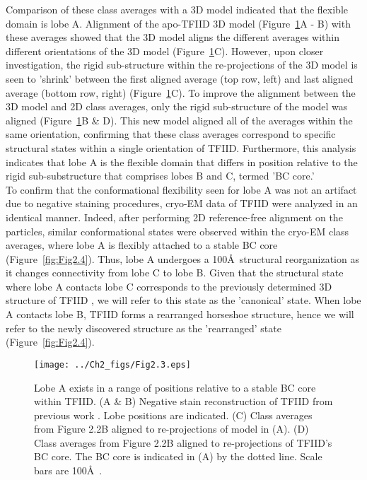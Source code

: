 \indent Comparison of these class averages with a 3D model indicated that the flexible domain is lobe A. Alignment of the apo-TFIID 3D model (Figure~\ref{fig:Fig2.3}A - B) with these averages showed that the 3D model aligns the different averages within different orientations of the 3D model (Figure~\ref{fig:Fig2.3}C). However, upon closer investigation, the rigid sub-structure within the re-projections of the 3D model is seen to 'shrink' between the first aligned average (top row, left) and last aligned average (bottom row, right) (Figure~\ref{fig:Fig2.3}C). To improve the alignment between the 3D model and 2D class averages, only the rigid sub-structure of the model was aligned (Figure~\ref{fig:Fig2.3}B \& D). This new model aligned all of the averages within the same orientation, confirming that these class averages correspond to specific structural states within a single orientation of TFIID. Furthermore, this analysis indicates that lobe A is the flexible domain that differs in position relative to the rigid sub-substructure that comprises lobes B and C, termed 'BC core.' \\
\indent To confirm that the conformational flexibility seen for lobe A was not an artifact due to negative staining procedures, cryo-EM data of TFIID were analyzed in an identical manner. Indeed, after performing 2D reference-free alignment on the particles, similar conformational states were observed within the cryo-EM class averages, where lobe A is flexibly attached to a stable BC core (Figure~\ref{fig:Fig2.4}). Thus, lobe A undergoes a 100\AA\ structural reorganization as it changes connectivity from lobe C to lobe B. Given that the structural state where lobe A contacts lobe C corresponds to the previously determined 3D structure of TFIID \cite{Andel_2407,Grob_1281}, we will refer to this state as the 'canonical' state. When lobe A contacts lobe B, TFIID forms a rearranged horseshoe structure, hence we will refer to the newly discovered structure as the 'rearranged' state (Figure~\ref{fig:Fig2.4}).\\
\begin{figure}
\centering
\texttt{[image: ../Ch2\_figs/Fig2.3.eps]}
\caption[Lobe A exists in a range of positions relative to a stable BC core within TFIID]{ Lobe A exists in a range of positions relative to a stable BC core within TFIID. (A \& B) Negative stain reconstruction of TFIID from previous work \cite{Grob_1281}.  Lobe positions are indicated. (C) Class averages from Figure 2.2B aligned to re-projections of model in (A). (D) Class averages from Figure 2.2B aligned to re-projections of TFIID's BC core. The BC core is indicated in (A) by the dotted line. Scale bars are 100\AA\ .} 
\label{fig:Fig2.3}
\end{figure}
